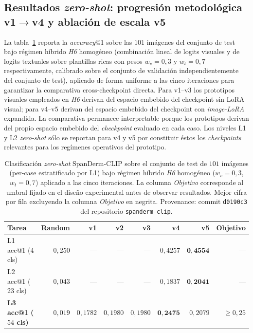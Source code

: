 \subsection*{Resultados \emph{zero-shot}: progresión metodológica
v1$\to$v4 y ablación de escala v5}

La tabla~\ref{tab:spanderm-zs} reporta la \emph{accuracy}@1 sobre
las $101$ imágenes del conjunto de test bajo régimen híbrido
\emph{H6} homogéneo (combinación lineal de logits visuales y de
logits textuales sobre plantillas ricas con pesos $w_v = 0{,}3$ y
$w_t = 0{,}7$ respectivamente, calibrado sobre el conjunto de
validación independientemente del conjunto de test), aplicado de
forma uniforme a las cinco iteraciones para garantizar la
comparativa cross-checkpoint directa. Para v1--v3 los prototipos
visuales empleados en \emph{H6} derivan del espacio embebido del
checkpoint sin LoRA visual; para v4--v5 derivan del espacio
embebido del checkpoint con \emph{image-LoRA} expandida. La
comparativa permanece interpretable porque los prototipos derivan
del propio espacio embebido del \emph{checkpoint} evaluado en cada
caso. Los niveles L1 y L2 \emph{zero-shot} sólo se reportan para
v4 y v5 por constituir éstos los \emph{checkpoints} relevantes
para los regímenes operativos del prototipo.

\begin{table}[H]
\centering
\footnotesize
\setlength{\tabcolsep}{3pt}
\renewcommand{\arraystretch}{0.95}
\caption{Clasificación \emph{zero-shot} SpanDerm-CLIP sobre el
conjunto de test de $101$ imágenes (per-case estratificado por
L1) bajo régimen híbrido \emph{H6} homogéneo
($w_v = 0{,}3$, $w_t = 0{,}7$) aplicado a las cinco iteraciones.
La columna \emph{Objetivo} corresponde al umbral fijado en el
diseño experimental antes de observar resultados. Mejor cifra
por fila excluyendo la columna \emph{Objetivo} en negrita.
Provenance: commit \texttt{d0190c3} del repositorio
\texttt{spanderm-clip}.}
\label{tab:spanderm-zs}
\begin{tabular}{lrrrrrrr}
\hline
Tarea                        & Random    & v1                  & v2                  & v3                  & v4                  & v5                  & Objetivo \\
\hline
L1 acc@1 ($4$ cls)            & $0{,}250$ & ---                 & ---                 & ---                 & $0{,}4257$          & $\mathbf{0{,}4554}$ & ---           \\
L2 acc@1 ($23$ cls)           & $0{,}043$ & ---                 & ---                 & ---                 & $0{,}1837$          & $\mathbf{0{,}2041}$ & ---           \\
\textbf{L3 acc@1 ($54$ cls)}  & $0{,}019$ & $0{,}1782$          & $0{,}1980$          & $0{,}1980$          & $\mathbf{0{,}2475}$ & $0{,}2079$          & $\geq 0{,}25$ \\
\hline
\end{tabular}
\end{table}

